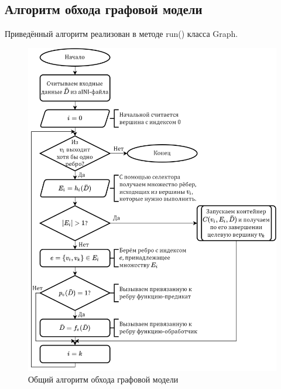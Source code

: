 \subsection{Алгоритм обхода графовой модели}
\begin{frame}
    Приведённый алгоритм реализован в методе run() класса Graph.

    \begin{figure}
        \centering
        \includegraphics[height=0.7\textheight]{images/flowchart.graphRunning2.png}
        \caption{Общий алгоритм обхода графовой модели}
    \end{figure}
\end{frame}

